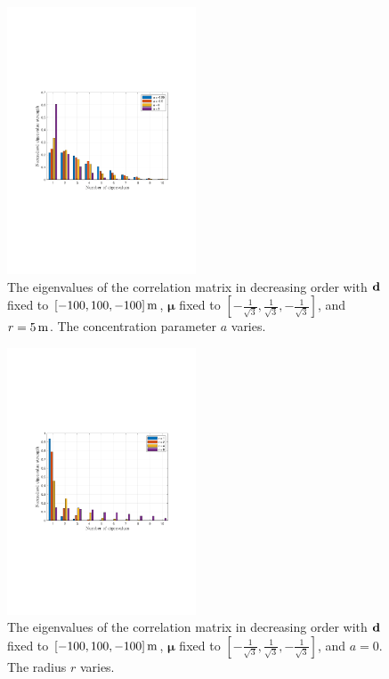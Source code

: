 \documentclass[a4paper,12pt]{article}
\begin{document}
\begin{framed}
    

    \begin{figure}[H]
        \centering 
        \includegraphics[width=0.5\textwidth]{figs/eigen_a.pdf} 
        \caption{The eigenvalues of the correlation matrix in decreasing order with ${\bf d}$ fixed to $[-100,100,-100]\,{\rm m}$, $\boldsymbol{\mu}$ fixed to $[-\frac{1}{\sqrt{3}},\frac{1}{\sqrt{3}},-\frac{1}{\sqrt{3}}]$, and $r=5\,{\rm m}$. The concentration parameter $a$ varies.} 
        \label{fig_eigen_a}
    \end{figure}
    \begin{figure}[H]
        \centering 
        \includegraphics[width=0.5\textwidth]{figs/eigen_r.pdf} 
        \caption{The eigenvalues of the correlation matrix in decreasing order with ${\bf d}$ fixed to $[-100,100,-100]\,{\rm m}$, $\boldsymbol{\mu}$ fixed to $[-\frac{1}{\sqrt{3}},\frac{1}{\sqrt{3}},-\frac{1}{\sqrt{3}}]$, and $a=0$. The radius $r$ varies.} 
        \label{fig_eigen_r}
    \end{figure}
    
\end{framed}
\end{document}
